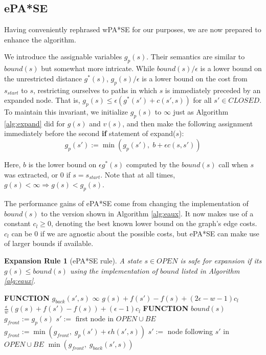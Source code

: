 \documentclass[letterpaper]{article}
\newtheorem{rul}{Expansion Rule}
\begin{document}
\subsection{ePA*SE}

Having conveniently rephrased wPA*SE for our purposes, we are now prepared to enhance the algorithm.

We introduce the assignable variables $g_p(s)$. Their semantics are similar to $bound(s)$ but somewhat more intricate. While $bound(s)/\epsilon$ is a lower bound on the unrestricted distance $g^*(s)$, $g_p(s)/\epsilon$ is a lower bound on the cost from $s_{start}$ to $s$, restricting ourselves to paths in which $s$ is immediately preceded by an expanded node. That is, $g_p(s) \le \epsilon (g^*(s') + c(s',s))$ for all $s'\in CLOSED$. To maintain this invariant, we initialize $g_p(s)$ to $\infty$ just as Algorithm \ref{alg:expand} did for $g(s)$ and $v(s)$, and then make the following assignment immediately before the second \textbf{if} statement of expand($s$):
\[g_p(s') := \min(g_p(s'),\; b + \epsilon c(s,s'))\]

Here, $b$ is the lower bound on $\epsilon g^*(s)$ computed by the $bound(s)$ call when $s$ was extracted, or $0$ if $s=s_{start}$. Note that at all times, $g(s) < \infty \Rightarrow g(s) < g_p(s)$.

The performance gains of ePA*SE come from changing the implementation of $bound(s)$ to the version shown in Algorithm \ref{alg:eaux}. It now makes use of a constant $c_l \ge 0$, denoting the best known lower bound on the graph's edge costs. $c_l$ can be 0 if we are agnostic about the possible costs, but ePA*SE can make use of larger bounds if available.

\begin{rul}[ePA*SE rule]
A state $s\in OPEN$ is safe for expansion if its $g(s) \le bound(s)$ using the implementation of $bound$ listed in Algorithm \ref{alg:eaux}.
\end{rul}

\begin{algorithm}
\caption{$bound(s)$ in ePA*SE and PARA*}
\label{alg:eaux}
\begin{algorithmic}
\STATE \textbf{FUNCTION} $g_{back}(s',s)$
\RETURN $\infty$
\RETURN $g(s) + f(s') - f(s) + (2\epsilon-w-1)c_l$
\ELSE
\RETURN $\frac\epsilon w\left(g(s) + f(s') - f(s)\right) + (\epsilon-1)c_l$
\ENDIF
\STATE \textbf{FUNCTION} $bound(s)$
\STATE $g_{front} := g_p(s)$
\STATE $s' :=$ first node in $OPEN \cup BE$
\STATE $g_{front} := \min(g_{front},\;g_p(s') + \epsilon h(s',s))$
\STATE $s' :=$ node following $s'$ in $OPEN \cup BE$
\ENDWHILE
\RETURN $\min(g_{front},\;g_{back}(s',s))$
\end{algorithmic}
\end{algorithm}
\end{document}
